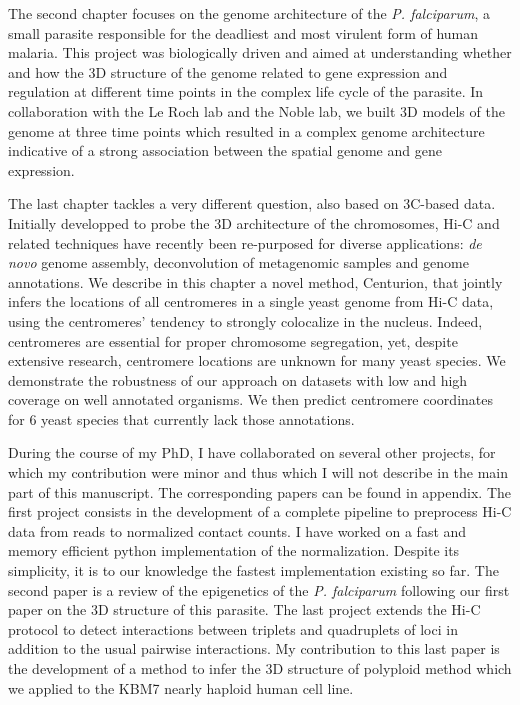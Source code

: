 \begin{abstracts}
The second chapter focuses on the genome architecture of the {\em P.
falciparum}, a small parasite responsible for the deadliest and most virulent
form of human malaria. This project was biologically driven and aimed at
understanding whether and how the 3D structure of the genome related to gene
expression and regulation at different time points in the complex life cycle
of the parasite. In collaboration with the Le Roch lab and the Noble 
lab, we built 3D
models of the genome at three time points which resulted in a complex genome
architecture indicative of a strong association between the spatial genome and
gene expression.

The last chapter tackles a very different question, also based on 3C-based
data. Initially developped to probe the 3D architecture of the chromosomes,
Hi-C and related techniques have recently been re-purposed for diverse
applications: \textit{de novo} genome assembly, deconvolution of metagenomic
samples and genome annotations. We describe in this chapter a novel method,
Centurion, that jointly infers the locations of all centromeres in a single yeast
genome from Hi-C data, using the centromeres' tendency to strongly colocalize
in the nucleus.  Indeed, centromeres are essential for proper chromosome
segregation, yet, despite extensive research, centromere locations are unknown
for many yeast species. We demonstrate the robustness of our approach on
datasets with low and high coverage on well annotated organisms. We then
predict centromere coordinates for 6 yeast species that currently lack those
annotations.

During the course of my PhD, I have collaborated on several other projects,
for which my contribution were minor and thus which I will not describe in the
main part of this manuscript. The corresponding papers can be found in
appendix. The first project consists in the development of a complete pipeline
to preprocess Hi-C data from reads to normalized contact counts. I have worked
on a fast and memory efficient python implementation of the normalization.
Despite its simplicity, it is to our
knowledge the fastest implementation existing so far. The second paper is a
review of the epigenetics of the {\em P. falciparum} following our first paper
on the 3D structure of this parasite. The last project extends the Hi-C
protocol to detect interactions between triplets and quadruplets of loci in
addition to the usual pairwise interactions. My contribution to this last paper
is the development of a method to infer the 3D structure of polyploid method
which we applied to the KBM7 nearly haploid human cell line.


\end{abstracts}



